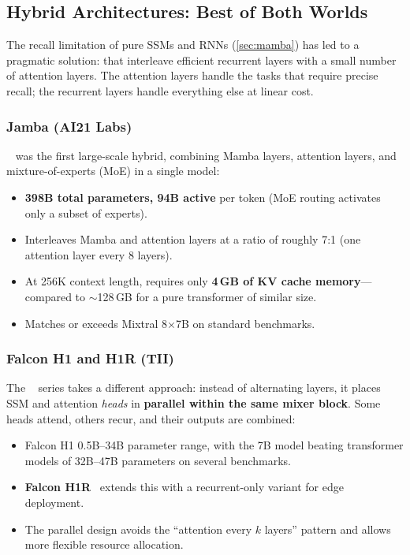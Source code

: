 \subsection{Hybrid Architectures: Best of Both Worlds}
\label{sec:hybrid-archs}

The recall limitation of pure SSMs and RNNs
(\cref{sec:mamba}) has led to a pragmatic solution:
 that interleave efficient recurrent
layers with a small number of attention layers. The attention layers
handle the tasks that require precise recall; the recurrent layers
handle everything else at linear cost.

\subsubsection{Jamba (AI21 Labs)}

~\cite{lieber2024jamba} was the first large-scale
hybrid, combining Mamba layers, attention layers, and
mixture-of-experts (MoE) in a single model:

\begin{itemize}[leftmargin=2em]
  \item \textbf{398B total parameters, 94B active} per token (MoE
    routing activates only a subset of experts).
  \item Interleaves Mamba and attention layers at a ratio of roughly
    7:1 (one attention layer every 8 layers).
  \item At 256K context length, requires only \textbf{4\,GB of KV
    cache memory}---compared to $\sim$128\,GB for a pure transformer
    of similar size.
  \item Matches or exceeds Mixtral 8$\times$7B on standard
    benchmarks.
\end{itemize}

\subsubsection{Falcon H1 and H1R (TII)}

The ~\cite{tii2025falconh1} series takes a
different approach: instead of alternating layers, it places SSM and
attention \emph{heads} in \textbf{parallel within the same mixer
block}. Some heads attend, others recur, and their outputs are
combined:

\begin{itemize}[leftmargin=2em]
  \item Falcon H1 0.5B--34B parameter range, with the 7B model
    beating transformer models of 32B--47B parameters on several
    benchmarks.
  \item \textbf{Falcon H1R}~\cite{tii2026falconh1r} extends this
    with a recurrent-only variant for edge deployment.
  \item The parallel design avoids the ``attention every $k$ layers''
    pattern and allows more flexible resource allocation.
\end{itemize}

